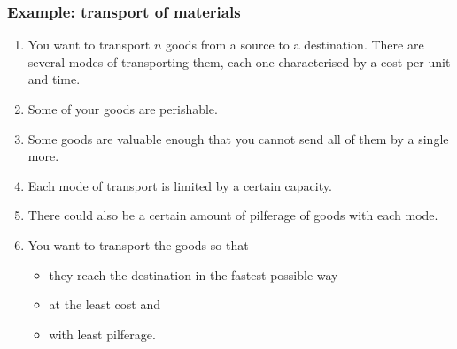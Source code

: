 \documentclass{beamer}
\begin{document}
\begin{frame}
\frametitle{Example: transport of materials}
\begin{enumerate}
\item You want to transport $n$ goods from a source to a destination. There
are several modes of transporting them, each one characterised by a cost 
per unit and time.
\item Some of your goods are perishable. 
\item Some goods are valuable enough that you cannot send all of them by a
single more.
\item Each mode of transport is limited by a certain capacity.
\item There could also be a certain amount of pilferage of goods with each mode.
\item You want to transport the goods so that
\begin{itemize}
\item they reach the destination in the fastest possible way
\item at the least cost and
\item with least pilferage.
\end{itemize}
\end{enumerate}
\end{frame}
\end{document}
